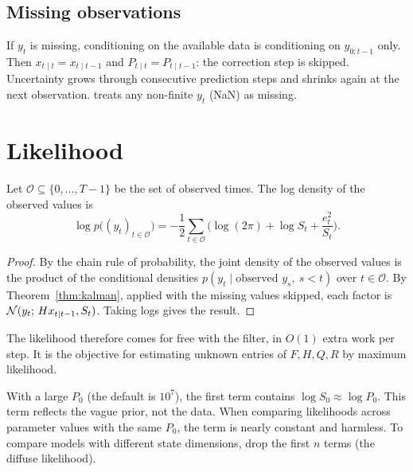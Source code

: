 \documentclass[11pt,a4paper]{article}
\begin{document}
\subsection{Missing observations}
If $y_t$ is missing, conditioning on the available data is conditioning on
$y_{0:t-1}$ only. Then $x_{t\mid t}=x_{t\mid t-1}$ and $P_{t\mid t}=P_{t\mid t-1}$: the
correction step is skipped. Uncertainty grows through consecutive prediction steps
and shrinks again at the next observation.  treats any non-finite
$y_t$ (NaN) as missing.

\section{Likelihood}

\begin{proposition}\label{prop:likelihood}
Let $\mathcal O\subseteq\{0,\dots,T-1\}$ be the set of observed times. The log
density of the observed values is
\[
  \log p\big((y_t)_{t\in\mathcal O}\big) = -\frac12\sum_{t\in\mathcal O}\Big(\log(2\pi) + \log S_t + \frac{e_t^2}{S_t}\Big).
\]
\end{proposition}
\begin{proof}
By the chain rule of probability, the joint density of the observed values is the product of
the conditional densities $p(y_t\mid \text{observed }y_s,\ s<t)$ over
$t\in\mathcal O$. By Theorem~\ref{thm:kalman}, applied with the missing values
skipped, each factor is $\mathcal{N}(y_t;\,Hx_{t\mid t-1},S_t)$. Taking logs gives the result.
\end{proof}

The likelihood therefore comes for free with the filter, in $O(1)$ extra work
per step. It is the objective for estimating unknown entries of $F,H,Q,R$ by
maximum likelihood.

\begin{remark}
With a large $P_0$ (the  default is $10^7$), the first term contains
$\log S_0\approx\log P_0$. This term reflects the vague prior, not the
data. When comparing likelihoods across parameter values with the same $P_0$,
the term is nearly constant and harmless. To compare models with
different state dimensions, drop the first $n$ terms (the diffuse
likelihood).
\end{remark}

\end{document}
